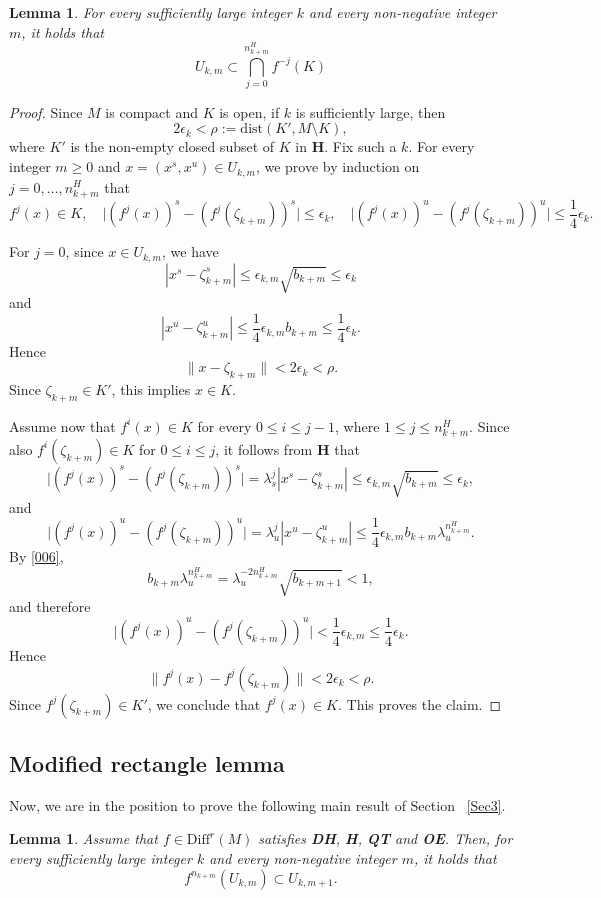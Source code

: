 \documentclass{amsart}
\theoremstyle{plain}
\newtheorem{lem}[thm]{Lemma}
\theoremstyle{definition}
\theoremstyle{remark}
\numberwithin{equation}{section}
\begin{document}
\begin{lem}\label{eq:Sec3-Usubset}
For every sufficiently large integer $k$ and every non-negative integer $m$, it holds that
\begin{equation*}
U_{k,m}\subset \bigcap_{j=0}^{n_{k+m}^H}f^{-j}(K)
\end{equation*}
\end{lem}
\begin{proof}
Since $M$ is compact and $K$ is open, if $k$ is sufficiently large, then
\[
2\epsilon_k < \rho:=\mathrm{dist}(K',M\setminus K),
\]
where $K'$ is the non-empty closed subset of $K$ in {\bf H}.
Fix such a $k$. For every integer $m\ge 0$ and $x=(x^s,x^u)\in U_{k,m}$,
we prove by induction on $j=0,\dots,n_{k+m}^H$ that
\[
f^j(x)\in K,
\quad
\bigl|(f^j(x))^s-(f^j(\zeta_{k+m}))^s\bigr|
\le \epsilon_k,
\quad
\bigl|(f^j(x))^u-(f^j(\zeta_{k+m}))^u\bigr|
\le \frac14\epsilon_k.
\]

For $j=0$, since $x\in U_{k,m}$, we have
\[
|x^s-\zeta_{k+m}^s|
\le
\epsilon_{k,m}\sqrt{b_{k+m}}
\le
\epsilon_k
\]
and
\[
|x^u-\zeta_{k+m}^u|
\le
\frac14\epsilon_{k,m}b_{k+m}
\le
\frac14\epsilon_k.
\]
Hence
\[
\|x-\zeta_{k+m}\|<2\epsilon_k<\rho.
\]
Since $\zeta_{k+m}\in K'$, this implies $x\in K$.

Assume now that $f^i(x)\in K$ for every $0\le i\le j-1$, where $1\le j\le n_{k+m}^H$.
Since also $f^i(\zeta_{k+m})\in K$ for $0\le i\le j$, it follows from {\bf H} that
\[
\bigl|(f^j(x))^s-(f^j(\zeta_{k+m}))^s\bigr|
=
\lambda_s^j|x^s-\zeta_{k+m}^s|
\le
\epsilon_{k,m}\sqrt{b_{k+m}}
\le
\epsilon_k,
\]
and
\[
\bigl|(f^j(x))^u-(f^j(\zeta_{k+m}))^u\bigr|
=
\lambda_u^j|x^u-\zeta_{k+m}^u|
\le
\frac14\epsilon_{k,m}b_{k+m}\lambda_u^{n_{k+m}^H}.
\]
By \eqref{006},
\[
b_{k+m}\lambda_u^{n_{k+m}^H}
=
\lambda_u^{-2n_{k+m}^H}\sqrt{b_{k+m+1}}
<1,
\]
and therefore
\[
\bigl|(f^j(x))^u-(f^j(\zeta_{k+m}))^u\bigr|
<
\frac14\epsilon_{k,m}
\le
\frac14\epsilon_k.
\]
Hence
\[
\|f^j(x)-f^j(\zeta_{k+m})\|<2\epsilon_k<\rho.
\]
Since $f^j(\zeta_{k+m})\in K'$, we conclude that $f^j(x)\in K$.
This proves the claim.
\end{proof}

\subsection{Modified rectangle lemma}
Now, we are in the position to prove the following main result of Section ~\ref{Sec3}.

\begin{lem}\label{lem:mrl} Assume that $f\in\mathrm{Diff}^r(M)$ satisfies {\bf DH}, {\bf H}, {\bf QT} and {\bf OE}. Then, for every sufficiently large integer $k$ and every non-negative integer $m$, it holds that
\[f^{n_{k+m}}(U_{k,m})\subset U_{k,m+1}.\]
\end{lem}
\end{document}
